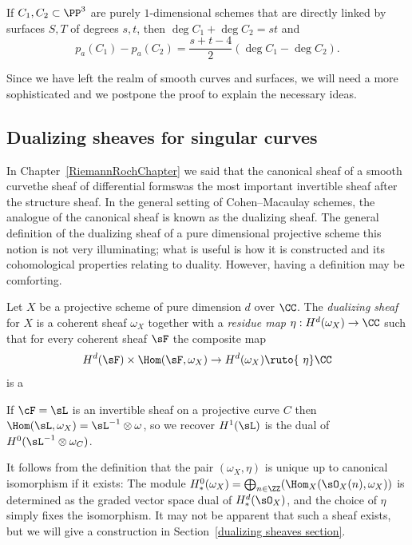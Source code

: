\begin{theorem}\label{direct linkage}\label{linked genus formula}
If $C_1,C_2\subset \PP^3$ are purely $1$-dimensional schemes that are
directly linked by surfaces $S,T$ of degrees $s,t$, then
$\deg C_1+\deg C_2 = st$ and
\vspace*{3pt}
$$
p_a(C_1) - p_a(C_2) = \frac{s+t-4}{2}(\deg C_1-\deg C_2).
$$
\end{theorem}

Since we have left the realm of smooth curves and surfaces, we will need
a more sophisticated
%
and we
postpone the proof to explain the necessary ideas.

\subsection*{Dualizing sheaves for singular curves}

In Chapter~\ref{RiemannRochChapter} we said that the
canonical sheaf of a smooth curve\emdash the sheaf of differential
forms\emdash was the most important invertible sheaf after the
structure sheaf. In the general setting of Cohen--Macaulay schemes,
the analogue of the canonical sheaf is
known as
the dualizing sheaf.
The general definition of
the dualizing sheaf of a pure dimensional projective scheme this notion
is not very illuminating;
what is useful is how it is constructed and its cohomological properties
relating to duality.
However, having a definition may be comforting.

\begin{definition}
Let $X$ be a projective scheme  of pure dimension $d$ over $\CC$. The
%
\emph{dualizing sheaf} for $X$ is a coherent sheaf $\omega_X$
\label{dualizing sheaf for singular curve}
together
with a \emph{residue map} $\eta: H^d(\omega_X) \to\nobreak \CC$ such that for
%
every coherent sheaf  $\sF$ the composite map
$$
H^d(\sF) \times \Hom(\sF, \omega_X) \to H^d(\omega_X) \ruto {\ \eta} \CC
$$
is a
%
\unif
\end{definition}

If $\cF = \sL$ is an invertible sheaf on a projective curve $C$
then $\Hom(\sL, \omega_X) = \sL^{-1}\otimes \omega$,
so
we recover
%
$H^{1}(\sL)$ is the dual of
$H^{0}(\sL^{-1}\otimes \omega_{C})$.

It follows from the definition that the pair $(\omega_{X}, \eta)$ is
unique up to canonical isomorphism if it exists:
The module $H^{0}_{*}(\omega_{X}) = \bigoplus_{n\in \ZZ}(\Hom_{X}(\sO_{X}(n),
\omega_{X}))$
is determined as the graded vector space dual of $H^{d}_{*}(\sO_{X})$,
and the choice of $\eta$ simply fixes the isomorphism. It may not be
apparent that such a sheaf exists, but we will give a construction in
Section~\ref{dualizing sheaves section}.

